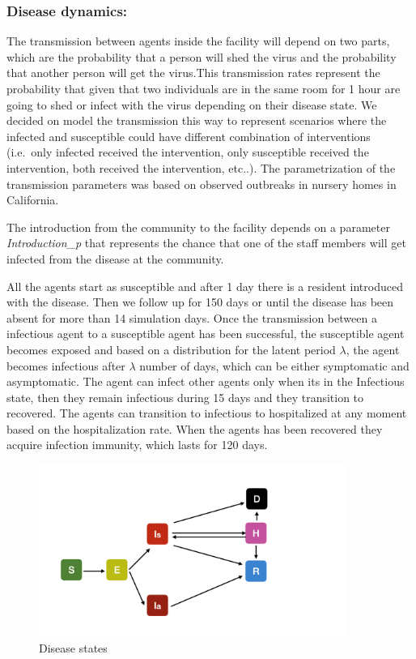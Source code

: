\documentclass[
]{article}
\begin{document}
\hypertarget{disease-dynamics}{%
\subsubsection{Disease dynamics:}\label{disease-dynamics}}

The transmission between agents inside the facility will depend on two
parts, which are the probability that a person will shed the virus and
the probability that another person will get the virus.This transmission
rates represent the probability that given that two individuals are in
the same room for 1 hour are going to shed or infect with the virus
depending on their disease state. We decided on model the transmission
this way to represent scenarios where the infected and susceptible could
have different combination of interventions (i.e.~only infected received
the intervention, only susceptible received the intervention, both
received the intervention, etc..). The parametrization of the
transmission parameters was based on observed outbreaks in nursery homes
in California.

The introduction from the community to the facility depends on a
parameter \emph{Introduction\_p} that represents the chance that one of
the staff members will get infected from the disease at the community.

All the agents start as susceptible and after 1 day there is a resident
introduced with the disease. Then we follow up for 150 days or until the
disease has been absent for more than 14 simulation days. Once the
transmission between a infectious agent to a susceptible agent has been
successful, the susceptible agent becomes exposed and based on a
distribution for the latent period \(\lambda\), the agent becomes
infectious after \(\lambda\) number of days, which can be either
symptomatic and asymptomatic. The agent can infect other agents only
when its in the Infectious state, then they remain infectious during 15
days and they transition to recovered. The agents can transition to
infectious to hospitalized at any moment based on the hospitalization
rate. When the agents has been recovered they acquire infection
immunity, which lasts for 120 days.

\begin{figure}
\caption{Disease states}
\centering
\includegraphics[width=10cm]{Figures/DiseaseDynamics}
\end{figure}
\end{document}
